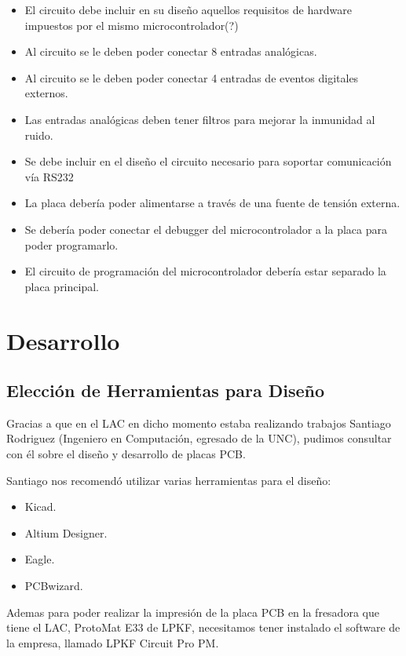 \begin{itemize}
\item El circuito debe incluir en su diseño aquellos requisitos de hardware impuestos por el mismo microcontrolador(?)
\item Al circuito se le deben poder conectar 8 entradas analógicas.
\item Al circuito se le deben poder conectar 4 entradas de eventos digitales externos.
\item Las entradas analógicas deben tener filtros para mejorar la inmunidad al ruido.
\item Se debe incluir en el diseño el circuito necesario para soportar comunicación vía RS232
\item La placa debería poder alimentarse a través de una fuente de tensión externa.
\item Se debería poder conectar el debugger del microcontrolador a la placa para poder programarlo.
\item El circuito de programación del microcontrolador debería estar separado la placa principal.
\end{itemize}



\section{Desarrollo} %
\label{sec:desarrollo}

\subsection{Elección de Herramientas para Diseño} %
\label{sec:herramientas_para_diseno}

Gracias a que en el LAC en dicho momento estaba realizando trabajos Santiago Rodriguez (Ingeniero en Computación, egresado de la UNC), pudimos consultar con él sobre el diseño y desarrollo de placas PCB. 

Santiago nos recomendó utilizar varias herramientas para el diseño:
\begin{itemize}
\item Kicad.
\item Altium Designer.
\item Eagle.
\item PCBwizard.
\end{itemize}

Ademas para poder realizar la impresión de la placa PCB en la fresadora que tiene el LAC, ProtoMat E33 de LPKF, necesitamos tener instalado el software de la empresa, llamado LPKF Circuit Pro PM.

